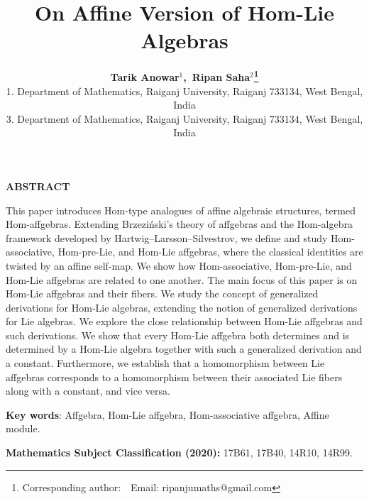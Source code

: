 \documentclass[14pt]{article}
\date{}
\theoremstyle{Definition}
\theoremstyle{remark}
\begin{document}
\renewcommand{\baselinestretch}{1.2}
\renewcommand{\arraystretch}{1.0}
\title{\bf On Affine Version of Hom-Lie Algebras}
\date{}
\author{{\bf Tarik Anowar$^{1}$,~Ripan Saha$^{2}$\footnote
        { Corresponding author:~~Email: ripanjumaths@gmail.com}}\\
{\small 1.  Department of Mathematics, Raiganj University, Raiganj 733134, West Bengal, India}\\
{\small 3. Department of Mathematics, Raiganj University, Raiganj 733134, West Bengal, India}
}
 \maketitle
\begin{center}
\begin{minipage}{12.cm}
\begin{center}{\bf ABSTRACT}\end{center}

This paper introduces Hom-type analogues of affine algebraic structures, termed Hom-affgebras. 
Extending Brzezi\'nski's theory of affgebras and the Hom-algebra framework developed by Hartwig--Larsson--Silvestrov, we define and study Hom-associative, Hom-pre-Lie, and Hom-Lie affgebras, 
where the classical identities are twisted by an affine self-map. We show how Hom-associative, Hom-pre-Lie, and Hom-Lie affgebras are related to one another. The main focus of this paper is on Hom-Lie affgebras and their fibers. We study the concept of generalized derivations for Hom-Lie algebras, extending the notion of generalized derivations for Lie algebras. We explore the close relationship between Hom-Lie affgebras and such derivations. We show that every Hom-Lie affgebra both determines and is determined by a Hom-Lie algebra together with such a generalized derivation and a constant. Furthermore, we establish that a homomorphism between Lie affgebras corresponds to a homomorphism between their associated Lie fibers along with a constant, and vice versa.




\medskip

{\bf Key words}: Affgebra, Hom-Lie affgebra, Hom-associative affgebra, Affine module.
\medskip

 {\bf Mathematics Subject Classification (2020):} 17B61, 17B40, 14R10, 14R99.
\end{minipage}
\end{center}
\normalsize\vskip0.5cm
\end{document}
